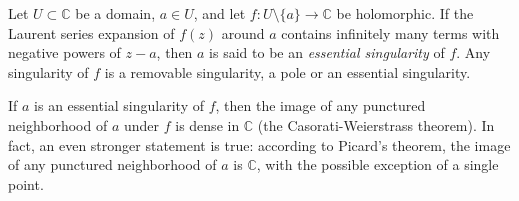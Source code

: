 \documentclass[12pt]{article}
\begin{document}
Let $U\subset\mathbb{C}$ be a domain, $a\in U$, and let $f:U \setminus \{a\} \to \mathbb{C}$ be holomorphic.  If the Laurent series expansion of $f(z)$ around $a$ contains infinitely many terms with negative powers of $z-a$, then $a$ is said to be an \emph{essential singularity} of $f$.  Any singularity of $f$ is a removable singularity, a pole or an essential singularity.

If $a$ is an essential singularity of $f$, then the image of any punctured neighborhood of $a$ under $f$ is dense in $\mathbb{C}$ (the Casorati-Weierstrass theorem).  In fact, an even stronger statement is true: according to Picard's theorem, the image of any punctured neighborhood of $a$ is $\mathbb{C}$, with the possible exception of a single point.
\end{document}
